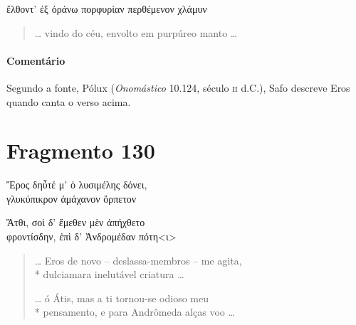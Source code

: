 \begin{gkverse}
ἔλθοντ’ ἐξ ὀράνω πορφυρίαν περθέμενον χλάμυν
\end{gkverse}

\begin{verse}
\ldots{} vindo do céu, envolto em purpúreo manto \ldots{} 
\end{verse}

{\paragraph{Comentário} Segundo a fonte, Pólux (\textit{Onomástico} 10.124, século \textsc{ii} d.C.), Safo descreve Eros quando canta o verso acima.}

\section{Fragmento 130}

\begin{gkverse}
Ἔρος δηὖτέ μ’ ὀ λυσιμέλης δόνει,\\
			γλυκύπικρον ἀμάχανον ὄρπετον\\

\ast\quad\ast\quad\ast

			Ἄτθι, σοὶ δ’ ἔμεθεν μὲν ἀπήχθετο\\
φροντίσδην, ἐπὶ δ’ Ἀνδρομέδαν πότη<ι>

\end{gkverse}

\begin{verse}
\ldots{} Eros de novo -- deslassa-membros -- me agita,\\*
dulciamara inelutável criatura \ldots{}

\ast\quad\ast\quad\ast

\ldots{} ó Átis, mas a ti tornou-se odioso meu\\*
pensamento, e para Andrômeda alças voo \ldots{}
\end{verse}

